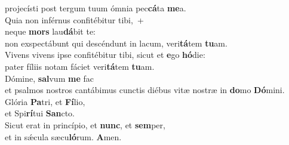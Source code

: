 \evenverse projecísti post tergum tuum ómnia pec\textbf{cá}ta \textbf{me}a.\\
\oddverse Quia non inférnus confitébitur tibi,~+\\
\oddverse  neque \textbf{mors} lau\textbf{dá}bit te:~\*\\
\oddverse non exspectábunt qui descéndunt in lacum, veri\textbf{tá}tem \textbf{tu}am.\\
\evenverse Vivens vivens ipse confitébitur tibi, sicut et \textbf{e}go \textbf{hó}die:~\*\\
\evenverse pater fíliis notam fáciet veri\textbf{tá}tem \textbf{tu}am.\\
\oddverse Dómine, \textbf{sal}vum \textbf{me} fac~\*\\
\oddverse et psalmos nostros cantábimus cunctis diébus vitæ nostræ in \textbf{do}mo \textbf{Dó}mini.\\
\evenverse Glória \textbf{Pa}tri, et \textbf{Fí}lio,~\*\\
\evenverse et Spi\textbf{rí}tui \textbf{San}cto.\\
\oddverse Sicut erat in princípio, et \textbf{nunc}, et \textbf{sem}per,~\*\\
\oddverse et in sǽcula sæcu\textbf{ló}rum. \textbf{A}men.\\
